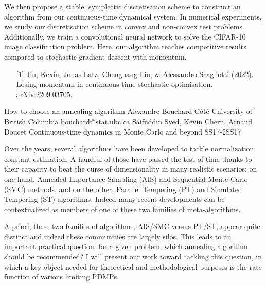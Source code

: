 \begin{talk}
We then propose a stable, symplectic discretisation scheme to construct an algorithm from our continuous-time dynamical system. In numerical experiments, we study our discretisation scheme in convex and non-convex test problems. Additionally, we train a convolutional neural network to solve the CIFAR-10 image classification problem. Here, our algorithm reaches competitive results compared to stochastic gradient descent with momentum.

\medskip

\begin{enumerate}
	\item[{[1]}] Jin, Kexin, Jonas Latz, Chenguang Liu, \& Alessandro Scagliotti (2022). Losing momentum in continuous-time stochastic optimisation. arXiv:2209.03705.
\end{enumerate}

\end{talk}

\begin{talk}
  {How to choose an annealing algorithm}%
  {Alexandre Bouchard-C\^ot\'e}%
  {University of British Columbia}%
  {bouchard@stat.ubc.ca}%
  {Saifuddin Syed, Kevin Chern, Arnaud Doucet}%
{Continuous-time dynamics in Monte Carlo and beyond}
{}{SS17-2}{SS17}


				
				

Over the years, several algorithms have been developed to tackle normalization constant estimation. A handful of those have passed the test of time thanks to their capacity to beat the curse of dimensionality in many realistic scenarios: on one hand, Annealed Importance Sampling (AIS) and Sequential Monte Carlo (SMC) methods, and on the other, Parallel Tempering (PT) and Simulated Tempering (ST) algorithms. Indeed many recent developments can be contextualized as members of one of these two families of meta-algorithms.

A priori, these two families of algorithms, AIS/SMC versus PT/ST, appear quite distinct and indeed these communities are largely silos. This leads to an important practical question: for a given problem, which annealing algorithm should be recommended? I will present our work toward tackling this question, in which a key object needed for theoretical and methodological purposes is the rate function of various limiting PDMPs. 
\end{talk}

